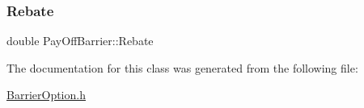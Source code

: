\subsubsection{\texorpdfstring{Rebate}{Rebate}}
{\footnotesize\ttfamily double Pay\+Off\+Barrier\+::\+Rebate\hspace{0.3cm}{\ttfamily [protected]}}



The documentation for this class was generated from the following file\+:\begin{DoxyCompactItemize}
\item 
\hyperlink{BarrierOption_8h}{Barrier\+Option.\+h}\end{DoxyCompactItemize}

